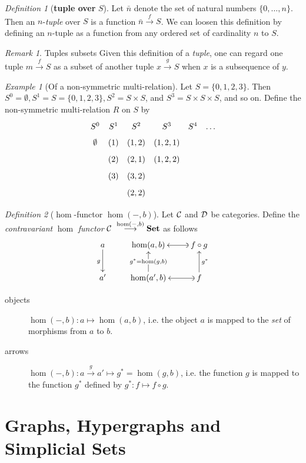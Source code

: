 \documentclass[10pt]{article}
\newcommand{\onearrow}[3]{\mbox{$#1 \stackrel{#2}{\longrightarrow} #3$}}
\newcommand{\calC}{\mbox{${\cal C}\ $}}
\newcommand{\calD}{\mbox{${\cal D}\ $}}
\newcommand{\maptob}[3]{\mbox{$#1: #2 \mapsto #3$}}
\theoremstyle{remark}
\newtheorem{remark}{Remark}
\newtheorem{definition}{Definition}
\newtheorem{example}{Example}
\begin{document}
\begin{definition}[\textbf{tuple over} $S$]
Let $\bar{n}$ denote the set of natural numbers $\{0, \ldots, n\}$. Then an $n$-\emph{tuple} over $S$ is
a function \onearrow{\bar{n}}{f}{S}. We can loosen this definition by defining an $n$-tuple as a function from any ordered set of cardinality $n$ to $S$.
\end{definition}

\begin{remark}{Tuples subsets}
Given this definition of a \emph{tuple}, one can regard one tuple \onearrow{m}{f}{S} as a subset of another
tuple \onearrow{x}{g}{S} when $x$ is a subsequence of $y$.
\end{remark}

\begin{example}[Of a non-symmetric multi-relation]
Let $S=\{0,1,2,3\}$. Then $S^0 = \emptyset, S^1 = S = \{0,1,2,3\}, S^2 = S \times S$, and $S^3 = S \times S \times S$, and so on. Define the non-symmetric multi-relation $R$ on $S$ by
$$\xymatrix@R=1ex@C=1ex{
S^0            &  S^1 & S^2   & S^3 & S^4 & \ldots \\
\emptyset  & (1)    & (1,2) & (1,2,1) \\
                   & (2)    & (2,1) & (1,2,2) \\
                   & (3)    & (3,2) \\
                   &	    & (2,2)
}
$$
\end{example}

\begin{definition}[$\hom$-functor $\hom(-,b)$]
Let \calC and \calD be categories. Define the \emph{contravariant} $\hom$ \emph{functor} \onearrow{\calC}{\hom(-,b)}{\mathbf{Set}} as follows
$$
\xymatrix{
a \ar[d]_{g} & \hom(a,b) & f \circ g \ar@{(->}[l] \\
a'   		  & \hom(a',b) \ar[u]|{g^* = \hom(g,b)} & f \ar@{(->}[l] \ar[u]_{g^*}
}
$$
\begin{description}
\item [objects] \maptob{\hom(-,b)}{a}{\hom(a,b)}, i.e. the object $a$ is mapped to the \emph{set} of morphisms from $a$ to $b$.
\item [arrows] \maptob{\hom(-,b)}{\onearrow{a}{g}{a'}}{g^* = \hom(g,b)}, i.e. the function $g$ is mapped to the function $g^*$ defined by \maptob{g^*}{f}{f \circ g}.
\end{description}
\end{definition}

\section{Graphs, Hypergraphs and Simplicial Sets}
\end{document}
